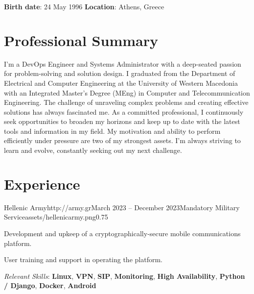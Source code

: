 \documentclass{mycv}
\begin{document}
	\pagestyle{empty}
	\begin{center}
		\textbf{Birth date}: 24 May 1996 {\Large\textperiodcentered} \textbf{Location}: Athens, Greece
	\end{center}

	\section{Professional Summary}
	I’m a DevOps Engineer and Systems Administrator with a deep-seated passion for problem-solving and solution design. I graduated from the Department of Electrical and Computer Engineering at the University of Western Macedonia with an Integrated Master's Degree (MEng) in Computer and Telecommunication Engineering. The challenge of unraveling complex problems and creating effective solutions has always fascinated me. As a committed professional, I continuously seek opportunities to broaden my horizons and keep up to date with the latest tools and information in my field. My motivation and ability to perform efficiently under pressure are two of my strongest assets. I'm always striving to learn and evolve, constantly seeking out my next challenge.

	\section{Experience}

	\begin{EntryDatedLogo}{Hellenic Army}{http://army.gr}{March 2023 -- December 2023}{Mandatory Military Service}{assets/hellenicarmy.png}{0.75}
		\begin{Itemize}
			\item Development and upkeep of a cryptographically-secure mobile communications platform.
			\item User training and support in operating the platform.
			\item \textit{Relevant Skills}: \textbf{Linux}, \textbf{VPN}, \textbf{SIP}, \textbf{Monitoring}, \textbf{High Availability}, \textbf{Python / Django}, \textbf{Docker}, \textbf{Android}
		\end{Itemize}
	\end{EntryDatedLogo}

	\vspace{0.5cm}
\end{document}
